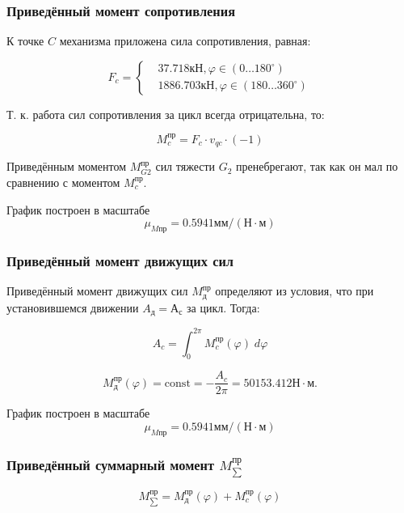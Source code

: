 \subsubsection{Приведённый момент сопротивления}

К точке $C$ механизма приложена сила сопротивления, равная:

\begin{equation}
	F_c = 
	\left\{\begin{aligned}
	& 37.718 кН, \varphi \in (0 \ldots 180^{\circ})\\ & 1886.703 кН, \varphi \in (180 \ldots 360^{\circ})
	\end{aligned}\right.
\end{equation}

Т. к. работа сил сопротивления за цикл всегда отрицательна, то:

\begin{equation}
	M_{c}^{пр} = F_c \cdot v_{qc} \cdot (-1)
\end{equation}

Приведённым моментом $M_{G2}^{пр}$ сил тяжести $G_2$ пренебрегают, так как он мал по сравнению с моментом $M_c^{пр}$.

График построен в масштабе $$ \mu_{Mпр} = 0.5941 мм/(Н \cdot м) $$

\subsubsection{Приведённый момент движущих сил}

Приведённый момент движущих сил $M_д^{пр}$ определяют из условия, что при установившемся движении $A_д = А_с$ за цикл. Тогда:

\begin{equation}
	A_c = \int_0^{2 \pi}{M_c^{пр}(\varphi) \; d \varphi}
\end{equation}

\begin{equation}
	M_д^{пр}(\varphi) =\text{const} = - \dfrac{A_c}{2 \pi} = 50153.412 Н \cdot м.
\end{equation}

График построен в масштабе $$ \mu_{Mпр} = 0.5941 мм/(Н \cdot м) $$

\subsubsection{Приведённый суммарный момент $M_{\sum}^{пр}$}

\begin{equation}
	 M_{\sum}^{пр} =  M_д^{пр}(\varphi) +  M_c^{пр}(\varphi)
\end{equation}

